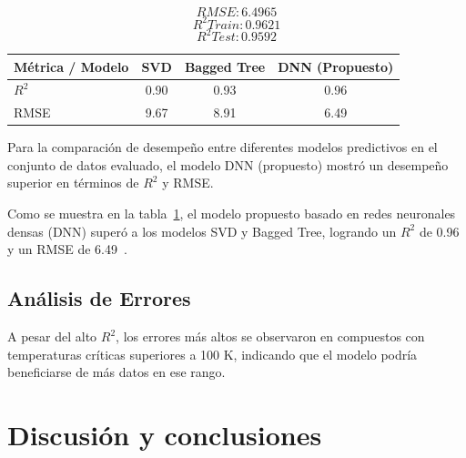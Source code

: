 \documentclass[conference]{IEEEtran} %
\begin{document}
$$RMSE: 6.4965$$
$$R^2 Train: 0.9621$$
$$R^2 Test: 0.9592$$

\begin{table}[!h]
    \centering
    \begin{tabular}{|l|c|c|c|}
    \hline
    \textbf{Métrica / Modelo} & \textbf{SVD} & \textbf{Bagged Tree} & \textbf{DNN (Propuesto)} \\ \hline
    $R^2$                     & 0.90         & 0.93                 & 0.96                     \\ 
    RMSE                      & 9.67         & 8.91                 & 6.49                     \\ 
    \hline
    \end{tabular}
    \label{tab:comp}
\end{table}
Para la comparación de desempeño entre diferentes modelos predictivos en el conjunto de datos evaluado, el modelo DNN (propuesto) mostró un desempeño superior en términos de $R^2$ y RMSE.

Como se muestra en la tabla~\ref{tab:comp}, el modelo propuesto basado en 
redes neuronales densas (DNN) superó a los modelos SVD y Bagged Tree, 
logrando un $R^2$ de 0.96 y un RMSE de 6.49~\cite{roter2020predicting}.

\subsection{Análisis de Errores}
A pesar del alto $R^2$, los errores más altos se observaron en compuestos 
con temperaturas críticas superiores a 100 K, indicando que el modelo 
podría beneficiarse de más datos en ese rango.

\section{Discusión y conclusiones}
\end{document}

